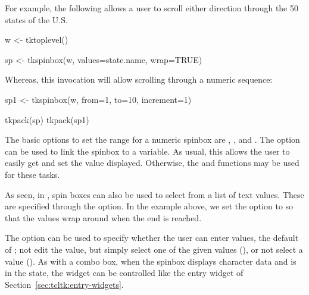 For example, the following allows a user to scroll either direction through the 50
states of the U.S.

\begin{Schunk}
\begin{Sinput}
 w <- tktoplevel()
\end{Sinput}
\end{Schunk}
\begin{Schunk}
\begin{Sinput}
 sp <- tkspinbox(w, values=state.name, wrap=TRUE)
\end{Sinput}
\end{Schunk}

Whereas, this invocation will allow scrolling through a numeric sequence:
\begin{Schunk}
\begin{Sinput}
 sp1 <- tkspinbox(w, from=1, to=10, increment=1)
\end{Sinput}
\end{Schunk}

\begin{Schunk}
\begin{Sinput}
 tkpack(sp)
 tkpack(sp1)
\end{Sinput}
\end{Schunk}


The basic options to set the range for a numeric spinbox are
, , and
.  The 
option can be used to link the spinbox to a \TCL\/ variable. As usual,
this allows the user to easily get and set the value
displayed. Otherwise, the  and 
functions may be used for these tasks. 

As seen, in \TK, spin boxes can also be used to select from a list of
text values. These are specified through the
 option. In the  example
above, we set the  option to  so
that the values wrap around when the end is reached.
 
The option  can be used to specify whether
the user can enter values, the default of ; not edit the
value, but simply select one of the given values (),
or not select a value ().  As with a combo box, when
the \TK\/ spinbox displays character data and is in the 
state, the widget can be controlled like the entry widget of
Section~\ref{sec:tcltk:entry-widgets}.



